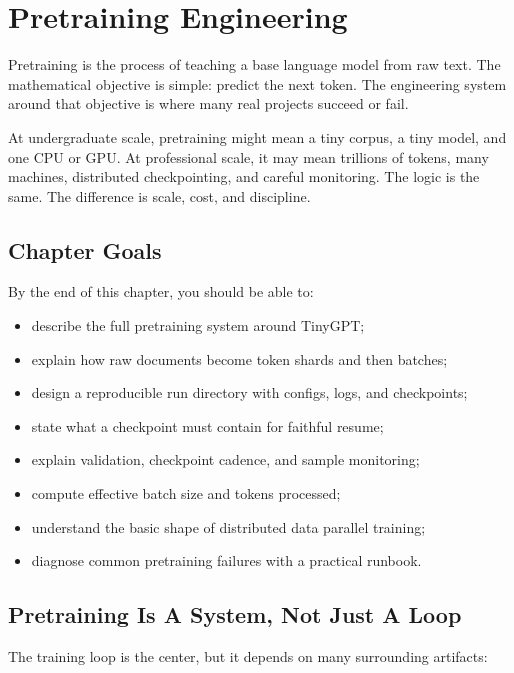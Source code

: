 \chapter{Pretraining Engineering}

Pretraining is the process of teaching a base language model from raw text. The mathematical objective is simple: predict the next token. The engineering system around that objective is where many real projects succeed or fail.

At undergraduate scale, pretraining might mean a tiny corpus, a tiny model, and one CPU or GPU. At professional scale, it may mean trillions of tokens, many machines, distributed checkpointing, and careful monitoring. The logic is the same. The difference is scale, cost, and discipline.

\section{Chapter Goals}

By the end of this chapter, you should be able to:

\begin{itemize}
  \item describe the full pretraining system around TinyGPT;
  \item explain how raw documents become token shards and then batches;
  \item design a reproducible run directory with configs, logs, and checkpoints;
  \item state what a checkpoint must contain for faithful resume;
  \item explain validation, checkpoint cadence, and sample monitoring;
  \item compute effective batch size and tokens processed;
  \item understand the basic shape of distributed data parallel training;
  \item diagnose common pretraining failures with a practical runbook.
\end{itemize}

\section{Pretraining Is A System, Not Just A Loop}

The training loop is the center, but it depends on many surrounding artifacts:

